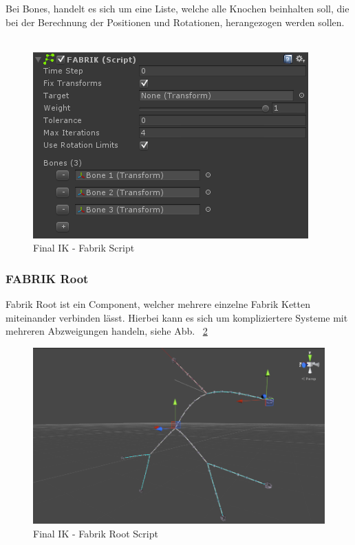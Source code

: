 Bei Bones, handelt es sich um eine Liste, welche alle Knochen beinhalten soll, die bei der Berechnung der
Positionen und Rotationen, herangezogen werden sollen.
~\cite{FinalIK_FABRIK_2021}
\begin {figure}
    \centering
    \includegraphics[scale=0.8]{pics/finalik_fabrik_script}
    \caption{Final IK - Fabrik Script}
    \label{fig:finalIK_fabrik_script}
\end {figure}


\subsubsection{FABRIK Root}


Fabrik Root ist ein Component, welcher mehrere einzelne Fabrik Ketten miteinander verbinden lässt.
Hierbei kann es sich um kompliziertere Systeme mit mehreren Abzweigungen handeln, siehe Abb. ~\ref{fig:finalIK_fabrik_root_example}

\begin {figure}
    \centering
    \includegraphics[scale=0.8]{pics/finalik_fabrik_root_example}
    \caption{Final IK - Fabrik Root Script}
    \label{fig:finalIK_fabrik_root_example}
\end {figure}

